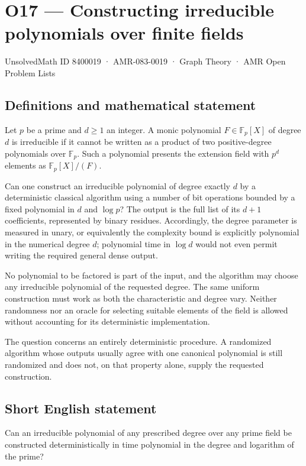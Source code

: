 \documentclass[11pt,a4paper]{article}
\begin{document}
\section*{O17 — Constructing irreducible polynomials over finite fields}\label{8400019}
{\small UnsolvedMath ID 8400019 · AMR-083-0019 · Graph Theory · AMR Open Problem Lists}
\subsection{Definitions and mathematical statement}
Let $p$ be a prime and $d\ge1$ an integer. A monic polynomial $F\in\mathbb F_p[X]$ of degree $d$ is irreducible if it cannot be written as a product of two positive-degree polynomials over $\mathbb F_p$. Such a polynomial presents the extension field with $p^d$ elements as $\mathbb F_p[X]/(F)$.

Can one construct an irreducible polynomial of degree exactly $d$ by a deterministic classical algorithm using a number of bit operations bounded by a fixed polynomial in $d$ and $\log p$? The output is the full list of its $d+1$ coefficients, represented by binary residues. Accordingly, the degree parameter is measured in unary, or equivalently the complexity bound is explicitly polynomial in the numerical degree $d$; polynomial time in $\log d$ would not even permit writing the required general dense output.

No polynomial to be factored is part of the input, and the algorithm may choose any irreducible polynomial of the requested degree. The same uniform construction must work as both the characteristic and degree vary. Neither randomness nor an oracle for selecting suitable elements of the field is allowed without accounting for its deterministic implementation.

The question concerns an entirely deterministic procedure. A randomized algorithm whose outputs usually agree with one canonical polynomial is still randomized and does not, on that property alone, supply the requested construction.
\subsection{Short English statement}
Can an irreducible polynomial of any prescribed degree over any prime field be constructed deterministically in time polynomial in the degree and logarithm of the prime?
\end{document}

